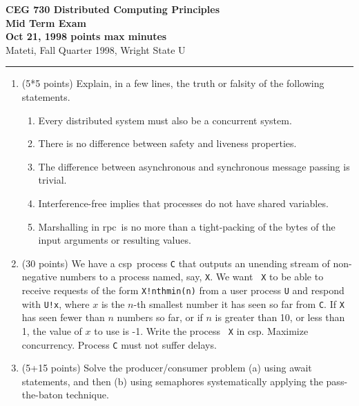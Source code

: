 \def\fat{\framebox[1mm]{\rule{0mm}{2mm}}}
\def\CSP{{\sc csp}}
\def\RPC{{\sc rpc}}
\parindent=0pt



{\bf CEG 
\large \bf 730 Distributed Computing Principles\\[5pt]
\large Mid Term Exam\\[10pt]
Oct 21, 1998  points max  minutes\\
}
\bigskip
{Mateti,  Fall Quarter 1998, Wright State U}\\[-5pt]
\hrule

\begin{enumerate}

\item (5*5 points)
Explain, in a few lines, the truth or falsity of the following
statements.

\begin{enumerate}
\item
Every distributed system must also be a concurrent system.

\item
There is no difference between safety and liveness properties.

\item
The difference between asynchronous and synchronous message
passing is trivial.

\item
Interference-free implies that processes do not have shared variables.

\item Marshalling in \RPC\ is no more than a tight-packing
of the bytes of the input arguments or resulting values.

\end{enumerate}

\item (30 points)
We have a \CSP\ process {\tt C} that outputs an unending stream of
non-negative numbers to a process named, say, {\tt X}.  We want {\tt
X} to be able to receive requests of the form {\tt X!nthmin(n)} from a
user process {\tt U} and respond with {\tt U!x}, where $x$ is the
$n$-th smallest number it has seen so far from {\tt C}.  If {\tt X}
has seen fewer than $n$ numbers so far, or if $n$ is greater than 10,
or less than 1, the value of $x$ to use is -1.  Write the process {\tt
X} in \CSP.  Maximize concurrency.  Process {\tt C} must not suffer
delays.

\item (5+15 points) Solve the producer/consumer problem (a) using
await statements, and then (b) using semaphores systematically
applying the pass-the-baton technique.


\end{enumerate}

